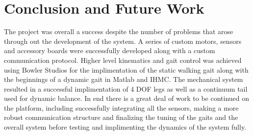 \section{Conclusion and Future Work}

The project was overall a success despite the number of problems that arose through out the development of the system. A series of custom motors, sensors and accessory boards were successfully developed along with a custom communication protocol. Higher level kinematics and gait control was achieved using Bowler Studios for the implimentation of the static walking gait along with the beginnings of a dynamic gait in Matlab and IHMC. The mechanical system resulted in a successful implimentation of 4 DOF legs as well as a continuum tail used for dynamic balance. In end there is a great deal of work to be continued on the platform, including successfully integrating all the sensors, making a more robust communication structure and finalizing the tuning of the gaits and the overall system before testing and implimenting the dynamics of the system fully.
